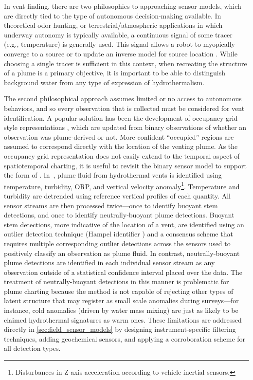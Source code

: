 In vent finding, there are two philosophies to approaching sensor models, which are directly tied to the type of autonomous decision-making available. In theoretical odor hunting, or terrestrial/atmospheric applications in which underway autonomy is typically available, a continuous signal of some tracer (e.g., temperature) is generally used. This signal allows a robot to myopically converge to a source \autocite{morse1998robust, edwards2005moth, reddy2022olfactory, wang20203, mason2020evaluation} or to update an inverse model for source location \autocite{vergassola2007infotaxis,salam2019adaptive}. While choosing a single tracer is sufficient in this context, when recreating the structure of a plume is a primary objective, it is important to be able to distinguish background water from any type of expression of hydrothermalism.

The second philosophical approach assumes limited or no access to autonomous behaviors, and so every observation that is collected must be considered for vent identification. A popular solution has been the development of occupancy-grid style representations \autocite{jakuba2008autonomous,peng2014dynamic}, which are updated from binary observations of whether an observation was plume-derived or not. More confident ``occupied'' regions are assumed to correspond directly with the location of the venting plume. As the occupancy grid representation does not easily extend to the temporal aspect of spatiotemporal charting, it is useful to revisit the binary sensor model to support the form of \PHUMES. In~\cite{jakuba2007stochastic}, plume fluid from hydrothermal vents is identified using temperature, turbidity, ORP, and vertical velocity anomaly\footnote{Disturbances in Z-axis acceleration according to vehicle inertial sensors.}. Temperature and turbidity are detrended using reference vertical profiles of each quantity. All sensor streams are then processed twice---once to identify buoyant stem detections, and once to identify neutrally-buoyant plume detections. Buoyant stem detections, more indicative of the location of a vent, are identified using an outlier detection technique (Hampel identifier \autocite{liu2004line}) and a consensus scheme that requires multiple corresponding outlier detections across the sensors used to positively classify an observation as plume fluid. In contrast, neutrally-buoyant plume detections are identified in each individual sensor stream as any observation outside of a statistical confidence interval placed over the data. The treatment of neutrally-buoyant detections in this manner is problematic for plume charting because the method is not capable of rejecting other types of latent structure that may register as small scale anomalies during surveys---for instance, cold anomalies (driven by water mass mixing) are just as likely to be claimed hydrothermal signatures as warm ones. These limitations are addressed directly in \cref{sec:field_sensor_models} by designing instrument-specific filtering techniques, adding geochemical sensors, and applying a corroboration scheme for all detection types.

